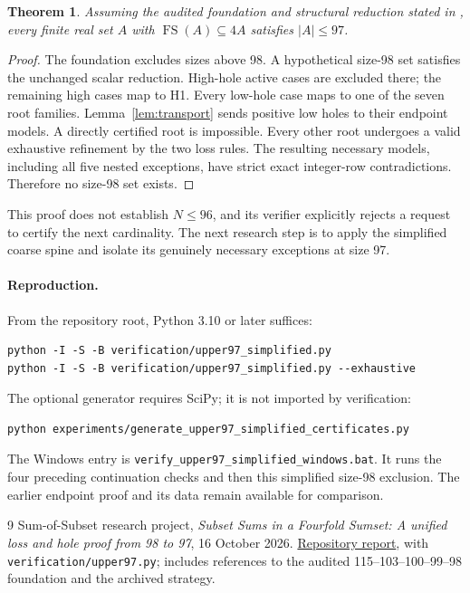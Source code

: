 \documentclass[11pt,a4paper]{article}
\newcommand{\FS}{\operatorname{FS}}
\newtheorem{theorem}{Theorem}[section]
\begin{document}
\begin{theorem}
Assuming the audited foundation and structural reduction stated in
\cite{previous}, every finite real set $A$ with $\FS(A)\subseteq4A$
satisfies $|A|\le97$.
\end{theorem}
\begin{proof}
The foundation excludes sizes above 98. A hypothetical size-98 set
satisfies the unchanged scalar reduction. High-hole active cases are
excluded there; the remaining high cases map to H1. Every low-hole case
maps to one of the seven root families. Lemma~\ref{lem:transport} sends
positive low holes to their endpoint models. A directly certified root
is impossible. Every other root undergoes a valid exhaustive refinement
by the two loss rules. The resulting necessary models, including all
five nested exceptions, have strict exact integer-row contradictions.
Therefore no size-98 set exists.
\end{proof}
This proof does not establish $N\le96$, and its verifier explicitly
rejects a request to certify the next cardinality. The next research
step is to apply the simplified coarse spine and isolate its genuinely
necessary exceptions at size 97.

\paragraph{Reproduction.}
From the repository root, Python 3.10 or later suffices:
\begin{verbatim}
python -I -S -B verification/upper97_simplified.py
python -I -S -B verification/upper97_simplified.py --exhaustive
\end{verbatim}
The optional generator requires SciPy; it is not imported by verification:
\begin{verbatim}
python experiments/generate_upper97_simplified_certificates.py
\end{verbatim}
The Windows entry is \texttt{verify\_upper97\_simplified\_windows.bat}.
It runs the four preceding continuation checks and then this simplified
size-98 exclusion. The earlier endpoint proof and its data remain available
for comparison.

\begin{thebibliography}{9}
 Sum-of-Subset research project,
\emph{Subset Sums in a Fourfold Sumset: A unified loss and hole proof from
98 to 97}, 16 October 2026.
\href{https://github.com/iH-3/Sum-of-Subset/blob/main/reports/upper97_from98_20261016.pdf}{Repository report},
with \texttt{verification/upper97.py}; includes references to the audited
115--103--100--99--98 foundation and the archived strategy.
\end{thebibliography}
\end{document}

